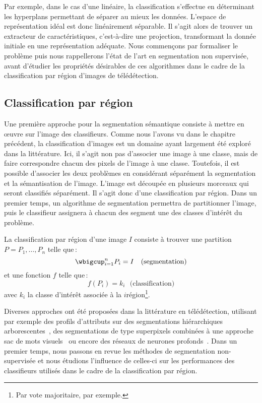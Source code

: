 Par exemple, dans le cas d'une  linéaire, la classification s'effectue en déterminant les hyperplans permettant de séparer au mieux les données. L'espace de représentation idéal est donc linéairement séparable. Il s'agit alors de trouver un extracteur de caractéristiques, c'est-à-dire une projection, transformant la donnée initiale en une représentation adéquate. Nous commençons par formaliser le problème puis nous rappellerons l'état de l'art en segmentation non supervisée, avant d'étudier les propriétés désirables de ces algorithmes dans le cadre de la classification par région d'images de télédétection.

\subsection{Classification par région}

Une première approche pour la segmentation sémantique consiste à mettre en \oe{}uvre sur l'image des classifieurs. Comme nous l'avons vu dans le chapitre précédent, la classification d'images est un domaine ayant largement été exploré dans la littérature. Ici, il s'agit non pas d'associer une image à une classe, mais de faire correspondre chacun des pixels de l'image à une classe. Toutefois, il est possible d'associer les deux problèmes en considérant séparément la segmentation et la sémantisation de l'image. L'image est découpée en plusieurs morceaux qui seront classifiés séparément. Il s'agit donc d'une classification par région. Dans un premier temps, un algorithme de segmentation permettra de partitionner l'image, puis le classifieur assignera à chacun des segment une des classes d'intérêt du problème.
\begin{definition}
La classification par région d'une image $I$ consiste à trouver une partition $P = {P_1, \dots, P_n}$ telle que\,:
$$\wbigcup_{i=1}^n P_i = I~~~\text{(segmentation)}$$
et une fonction $f$ telle que\,:
$$f(P_i) = k_i~~~\text{(classification)}$$
avec $k_i$ la classe d'intérêt associée à la $i$\ieme région\footnote{Par vote majoritaire, par exemple.}.
\end{definition}

Diverses approches ont été proposées dans la littérature en télédétection, utilisant par exemple des profils d'attributs sur des segmentations hiérarchiques arborescentes~\cite{bosilj_indexation_2016}, des segmentations de type superpixels combinées à une approche sac de mots visuels~\cite{li_superpixel-based_2018} ou encore des réseaux de neurones profonds~\cite{gong_superpixel-based_2017}. Dans un premier temps, nous passons en revue les méthodes de segmentation non-supervisée et nous étudions l'influence de celles-ci sur les performances des classifieurs utilisés dans le cadre de la classification par région.

